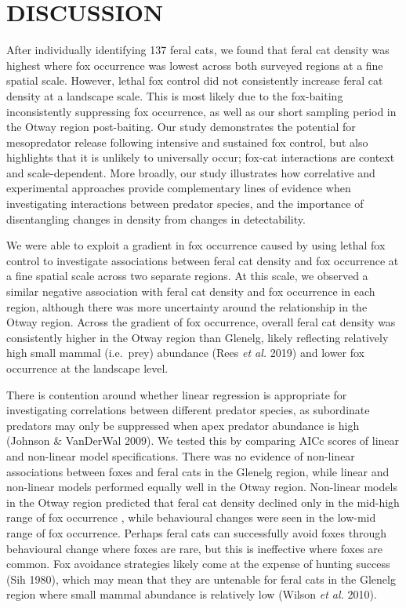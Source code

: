 \documentclass[]{elsarticle} %
\begin{document}
\newpage

\hypertarget{discussion}{%
\section{DISCUSSION}\label{discussion}}

After individually identifying 137 feral cats, we found that feral cat density was highest where fox occurrence was lowest across both surveyed regions at a fine spatial scale. However, lethal fox control did not consistently increase feral cat density at a landscape scale. This is most likely due to the fox-baiting inconsistently suppressing fox occurrence, as well as our short sampling period in the Otway region post-baiting. Our study demonstrates the potential for mesopredator release following intensive and sustained fox control, but also highlights that it is unlikely to universally occur; fox-cat interactions are context and scale-dependent. More broadly, our study illustrates how correlative and experimental approaches provide complementary lines of evidence when investigating interactions between predator species, and the importance of disentangling changes in density from changes in detectability.

We were able to exploit a gradient in fox occurrence caused by using lethal fox control to investigate associations between feral cat density and fox occurrence at a fine spatial scale across two separate regions. At this scale, we observed a similar negative association with feral cat density and fox occurrence in each region, although there was more uncertainty around the relationship in the Otway region. Across the gradient of fox occurrence, overall feral cat density was consistently higher in the Otway region than Glenelg, likely reflecting relatively high small mammal (i.e.~prey) abundance (Rees \emph{et al.} 2019) and lower fox occurrence at the landscape level.

There is contention around whether linear regression is appropriate for investigating correlations between different predator species, as subordinate predators may only be suppressed when apex predator abundance is high (Johnson \& VanDerWal 2009). We tested this by comparing AICc scores of linear and non-linear model specifications. There was no evidence of non-linear associations between foxes and feral cats in the Glenelg region, while linear and non-linear models performed equally well in the Otway region. Non-linear models in the Otway region predicted that feral cat density declined only in the mid-high range of fox occurrence , while behavioural changes were seen in the low-mid range of fox occurrence. Perhaps feral cats can successfully avoid foxes through behavioural change where foxes are rare, but this is ineffective where foxes are common. Fox avoidance strategies likely come at the expense of hunting success (Sih 1980), which may mean that they are untenable for feral cats in the Glenelg region where small mammal abundance is relatively low (Wilson \emph{et al.} 2010).
\end{document}
